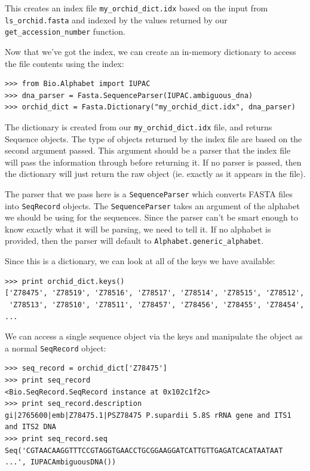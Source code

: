 \documentclass{report}
\begin{document}
This creates an index file \verb|my_orchid_dict.idx| based on the input from \verb|ls_orchid.fasta| and indexed by the values returned by our \verb|get_accession_number| function.


Now that we've got the index, we can create an in-memory dictionary to access the file contents using the index:

\begin{verbatim}
>>> from Bio.Alphabet import IUPAC
>>> dna_parser = Fasta.SequenceParser(IUPAC.ambiguous_dna)
>>> orchid_dict = Fasta.Dictionary("my_orchid_dict.idx", dna_parser)
\end{verbatim} 

The dictionary is created from our \verb|my_orchid_dict.idx| file, and returns Sequence objects. The type of objects returned by the index file are based on the second argument passed. This argument should be a parser that the index file will pass the information through before returning it. If no parser is passed, then the dictionary will just return the raw object (ie. exactly as it appears in the file). 


The parser that we pass here is a \verb|SequenceParser| which converts FASTA files into \verb|SeqRecord| objects. The \verb|SequenceParser| takes an argument of the alphabet we should be using for the sequences. Since the parser can't be smart enough to know exactly what it will be parsing, we need to tell it. If no alphabet is provided, then the parser will default to \verb|Alphabet.generic_alphabet|.


Since this is a dictionary, we can look at all of the keys we have available:

\begin{verbatim}
>>> print orchid_dict.keys()
['Z78475', 'Z78519', 'Z78516', 'Z78517', 'Z78514', 'Z78515', 'Z78512', 
 'Z78513', 'Z78510', 'Z78511', 'Z78457', 'Z78456', 'Z78455', 'Z78454', 
...
\end{verbatim} 

We can access a single sequence object via the keys and manipulate the object as a normal \verb|SeqRecord| object:

\begin{verbatim}
>>> seq_record = orchid_dict['Z78475']
>>> print seq_record
<Bio.SeqRecord.SeqRecord instance at 0x102c1f2c>
>>> print seq_record.description
gi|2765600|emb|Z78475.1|PSZ78475 P.supardii 5.8S rRNA gene and ITS1 and ITS2 DNA
>>> print seq_record.seq
Seq('CGTAACAAGGTTTCCGTAGGTGAACCTGCGGAAGGATCATTGTTGAGATCACATAATAAT ...', IUPACAmbiguousDNA())
\end{verbatim}
\end{document}
